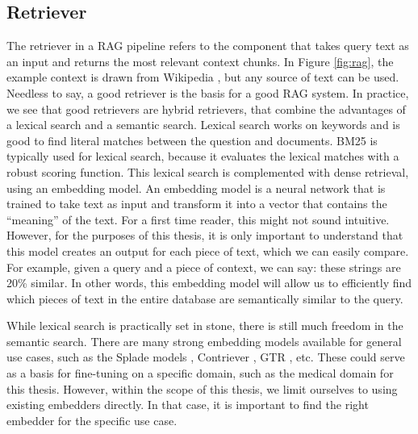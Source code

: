\subsection{Retriever}
The retriever in a RAG pipeline refers to the component that takes query text as an input and returns the most relevant context chunks. In Figure \ref{fig:rag}, the example context is drawn from Wikipedia \cite{eiffel_wikipedia}, but any source of text can be used. Needless to say, a good retriever is the basis for a good RAG system. In practice, we see that good retrievers are hybrid retrievers, that combine the advantages of a lexical search and a semantic search. Lexical search works on keywords and is good to find literal matches between the question and documents. BM25 \cite{robertson2009probabilistic} is typically used for lexical search, because it evaluates the lexical matches with a robust scoring function. This lexical search is complemented with dense retrieval, using an embedding model. An embedding model is a neural network that is trained to take text as input and transform it into a vector that contains the ``meaning'' of the text. For a first time reader, this might not sound intuitive. However, for the purposes of this thesis, it is only important to understand that this model creates an output for each piece of text, which we can easily compare. For example, given a query and a piece of context, we can say: these strings are 20\% similar. In other words, this embedding model will allow us to efficiently find which pieces of text in the entire database are semantically similar to the query. 

While lexical search is practically set in stone, there is still much freedom in the semantic search. There are many strong embedding models available for general use cases, such as the Splade models \cite{formal2021splade, formal2021spladev2, lassance2024spladev3}, Contriever \cite{izacard2021unsupervisedcontriever}, GTR \cite{ni2021largegtr}, etc. These could serve as a basis for fine-tuning on a specific domain, such as the medical domain for this thesis. However, within the scope of this thesis, we limit ourselves to using existing embedders directly. In that case, it is important to find the right embedder for the specific use case.

